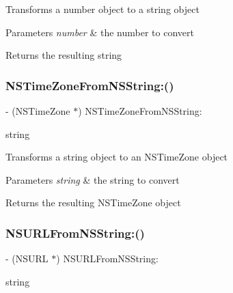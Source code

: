 Transforms a number object to a string object 
\begin{DoxyParams}{Parameters}
{\em number} & the number to convert \\
\hline
\end{DoxyParams}
\begin{DoxyReturn}{Returns}
the resulting string 
\end{DoxyReturn}
\mbox{\label{interface_o_p_t_l_y_j_s_o_n_value_transformer_a8bc2b1ca2845b275c0a0d6662af137d0}} 
\subsubsection{\texorpdfstring{N\+S\+Time\+Zone\+From\+N\+S\+String\+:()}{NSTimeZoneFromNSString:()}}
{\footnotesize\ttfamily -\/ (N\+S\+Time\+Zone $\ast$) N\+S\+Time\+Zone\+From\+N\+S\+String\+: \begin{DoxyParamCaption}\item[{(N\+S\+String $\ast$)}]{string }\end{DoxyParamCaption}}

Transforms a string object to an N\+S\+Time\+Zone object 
\begin{DoxyParams}{Parameters}
{\em string} & the string to convert \\
\hline
\end{DoxyParams}
\begin{DoxyReturn}{Returns}
the resulting N\+S\+Time\+Zone object 
\end{DoxyReturn}
\mbox{\label{interface_o_p_t_l_y_j_s_o_n_value_transformer_a248bf63376f69fba336eb0ba4b420bc3}} 
\subsubsection{\texorpdfstring{N\+S\+U\+R\+L\+From\+N\+S\+String\+:()}{NSURLFromNSString:()}}
{\footnotesize\ttfamily -\/ (N\+S\+U\+RL $\ast$) N\+S\+U\+R\+L\+From\+N\+S\+String\+: \begin{DoxyParamCaption}\item[{(N\+S\+String $\ast$)}]{string }\end{DoxyParamCaption}}

